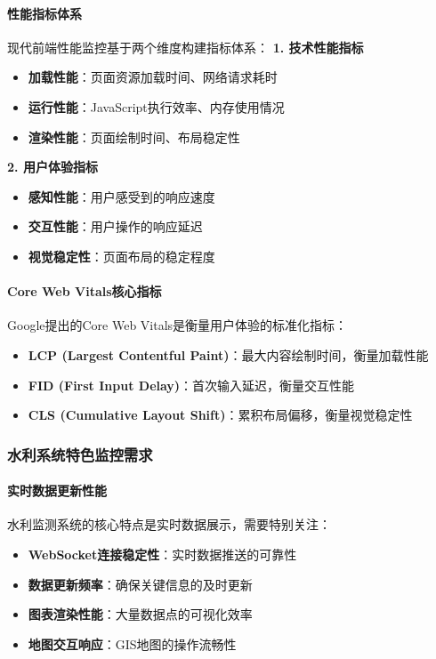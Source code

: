 \paragraph{性能指标体系}\label{ux6027ux80fdux6307ux6807ux4f53ux7cfb} 现代前端性能监控基于两个维度构建指标体系： \textbf{1. 技术性能指标} \begin{itemize}
\tightlist \item \textbf{加载性能}：页面资源加载时间、网络请求耗时 \item \textbf{运行性能}：JavaScript执行效率、内存使用情况 \item
\textbf{渲染性能}：页面绘制时间、布局稳定性 \end{itemize} \textbf{2. 用户体验指标} \begin{itemize} \tightlist \item \textbf{感知性能}：用户感受到的响应速度
\item \textbf{交互性能}：用户操作的响应延迟 \item \textbf{视觉稳定性}：页面布局的稳定程度 \end{itemize} \paragraph{Core Web
Vitals核心指标}\label{core-web-vitalsux6838ux5fc3ux6307ux6807} Google提出的Core Web Vitals是衡量用户体验的标准化指标： \begin{itemize}
\tightlist \item \textbf{LCP (Largest Contentful Paint)}：最大内容绘制时间，衡量加载性能 \item \textbf{FID (First Input
Delay)}：首次输入延迟，衡量交互性能\\ \item \textbf{CLS (Cumulative Layout Shift)}：累积布局偏移，衡量视觉稳定性 \end{itemize}
\subsubsection{水利系统特色监控需求}\label{ux6c34ux5229ux7cfbux7edfux7279ux8272ux76d1ux63a7ux9700ux6c42}
\paragraph{实时数据更新性能}\label{ux5b9eux65f6ux6570ux636eux66f4ux65b0ux6027ux80fd} 水利监测系统的核心特点是实时数据展示，需要特别关注： \begin{itemize}
\tightlist \item \textbf{WebSocket连接稳定性}：实时数据推送的可靠性 \item \textbf{数据更新频率}：确保关键信息的及时更新 \item \textbf{图表渲染性能}：大量数据点的可视化效率
\item \textbf{地图交互响应}：GIS地图的操作流畅性 \end{itemize}
